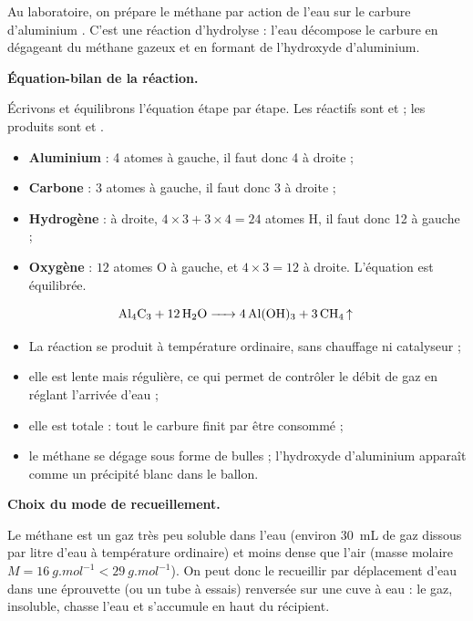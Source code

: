 \documentclass[11pt]{article}
\newcommand{\cle}[1]{{\popxbold\color{popdark}#1}}
\newcounter{popsec}
\newcounter{popsub}
\newcommand{\courssub}[1]{%
  \stepcounter{popsub}%
  \par\vspace{9pt}\noindent{\popxbold\fontsize{11.5}{13}\selectfont\color{popink}{\color{poporange}\thepopsec.\thepopsub}\hspace{6pt}#1}\par\nopagebreak\vspace{4pt}
}
\begin{document}
\begin{definition}
Au laboratoire, on prépare le méthane par action de l'eau sur le carbure d'aluminium . C'est une réaction d'\cle{hydrolyse} : l'eau décompose le carbure en dégageant du méthane gazeux et en formant de l'hydroxyde d'aluminium.
\end{definition}

\textbf{Équation-bilan de la réaction.}\par
Écrivons et équilibrons l'équation étape par étape. Les réactifs sont  et  ; les produits sont  et .

\begin{itemize}
\item \textbf{Aluminium} : 4 atomes à gauche, il faut donc 4  à droite ;
\item \textbf{Carbone} : 3 atomes à gauche, il faut donc 3  à droite ;
\item \textbf{Hydrogène} : à droite, $4 \times 3 + 3 \times 4 = 24$ atomes H, il faut donc 12  à gauche ;
\item \textbf{Oxygène} : $12$ atomes O à gauche, et $4 \times 3 = 12$ à droite. L'équation est équilibrée.
\end{itemize}

\[ \ce{Al4C3 + 12 H2O -> 4 Al(OH)3 + 3 CH4 ^} \]

\begin{aretenir}
\begin{itemize}
\item La réaction se produit à \cle{température ordinaire}, sans chauffage ni catalyseur ;
\item elle est \cle{lente} mais régulière, ce qui permet de contrôler le débit de gaz en réglant l'arrivée d'eau ;
\item elle est \cle{totale} : tout le carbure finit par être consommé ;
\item le méthane se dégage sous forme de bulles ; l'hydroxyde d'aluminium apparaît comme un précipité blanc dans le ballon.
\end{itemize}
\end{aretenir}

\courssub{Dispositif expérimental}

\textbf{Choix du mode de recueillement.}\par
Le méthane est un gaz \cle{très peu soluble dans l'eau} (environ \SI{30}{mL} de gaz dissous par litre d'eau à température ordinaire) et \cle{moins dense que l'air} (masse molaire $M = \SI{16}{g.mol^{-1}} < \SI{29}{g.mol^{-1}}$). On peut donc le recueillir par \cle{déplacement d'eau} dans une éprouvette (ou un tube à essais) renversée sur une cuve à eau : le gaz, insoluble, chasse l'eau et s'accumule en haut du récipient.
\end{document}
